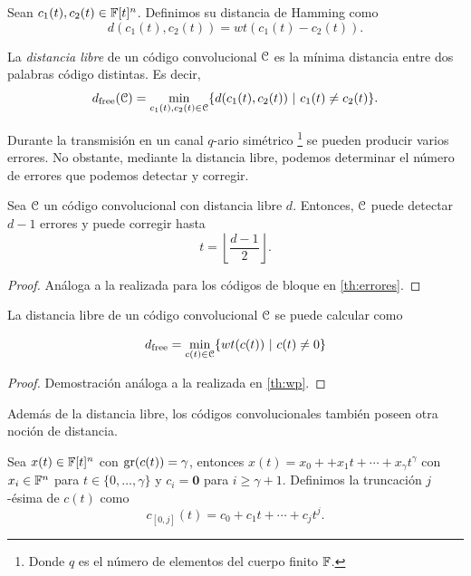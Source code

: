 \begin{definicion}
Sean $c_1(t),c_2(t) \in \mathbb{F}[t]^n$. Definimos su distancia de Hamming como 
$$d(c_1(t),c_2(t)) = wt(c_1(t) - c_2(t)).$$
\end{definicion}

\begin{definicion}\label{def:libre}
La \emph{distancia libre} de un código convolucional $\mathcal C$ es la mínima distancia entre dos palabras código distintas. Es decir,
$$d_{\text{free}}(\mathcal C) = \min_{c_1(t),c_2(t) \in \mathcal C} \{d(c_1(t),c_2(t)) \ | \ c_1(t) \neq c_2(t)\}.$$
\end{definicion}

Durante la transmisión en un canal $q$-ario simétrico \footnote{Donde $q$ es el número de elementos del cuerpo finito $\mathbb{F}$.} se pueden producir varios errores. No obstante, mediante la distancia libre, podemos determinar el número de errores que podemos detectar y corregir.

\begin{teorema}
Sea $\mathcal C$ un código convolucional con distancia libre $d$. Entonces, $\mathcal C$ puede detectar $d - 1$ errores y puede corregir hasta $$ t = \left\lfloor \frac{d-1}{2} \right\rfloor.$$
\end{teorema}

\begin{proof}
Análoga a la realizada para los códigos de bloque en \ref{th:errores}.
\end{proof}

\begin{lema}
La distancia libre de un código convolucional $\mathcal C$ se puede calcular como

$$d_{\text{free}} = \min_{c(t) \in \mathcal C} \{wt(c(t)) \ | \ c(t) \neq 0\}$$
\end{lema}

\begin{proof}
    Demostración análoga a la realizada en \ref{th:wp}.
\end{proof}

Además de la distancia libre, los códigos convolucionales también poseen otra noción de distancia.

\begin{definicion}
Sea $ x(t) \in \mathbb{F}[t]^n$ con $\operatorname{gr}(c(t)) = \gamma$, entonces $x(t) = x_0 + + x_1t +  \cdots + x_{\gamma}t^{\gamma}$ con $x_i \in \mathbb{F}^n$ para $t \in \{0,\dots,\gamma\}$ y $c_i = \mathbf{0}$ para $i \geq \gamma + 1$. Definimos la truncación $j$-ésima de $c(t)$ como $$c_{[0,j]}(t) = c_0 + c_1t + \cdots + c_jt^j.$$
\end{definicion}

